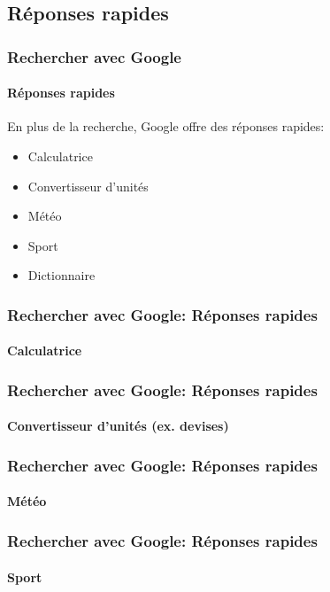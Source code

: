 \documentclass[xcolor=table]{beamer}
\begin{document}
\subsection{Réponses rapides}

\begin{frame}
\frametitle{Rechercher avec Google}
\framesubtitle{Réponses rapides}

En plus de la recherche, Google offre des réponses rapides:
\begin{itemize}
	\item Calculatrice 
	\item Convertisseur d'unités
	\item Météo 
	\item Sport
	\item Dictionnaire
\end{itemize}

\end{frame}

\begin{frame}
\frametitle{Rechercher avec Google: Réponses rapides}
\framesubtitle{Calculatrice}

\begin{center}
\end{center}

\end{frame}

\begin{frame}
\frametitle{Rechercher avec Google: Réponses rapides}
\framesubtitle{Convertisseur d'unités (ex. devises)}

\begin{center}
\end{center}

\end{frame}

\begin{frame}
\frametitle{Rechercher avec Google: Réponses rapides}
\framesubtitle{Météo}

\begin{center}
\end{center}

\end{frame}

\begin{frame}
\frametitle{Rechercher avec Google: Réponses rapides}
\framesubtitle{Sport}

\begin{center}
\end{center}

\end{frame}
\end{document}
